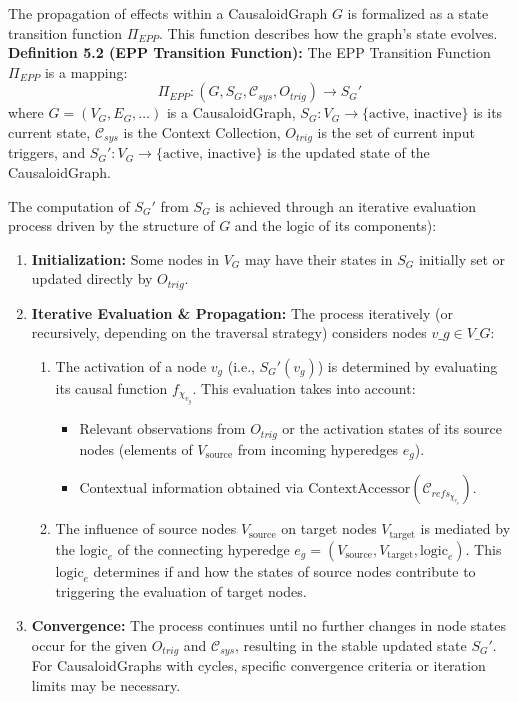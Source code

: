 \begin{definition}
\label{def:epp_transition}     
    The propagation of effects within a CausaloidGraph \(G\) is formalized as a state transition function \(\Pi_{EPP}\). This function describes how the graph's state evolves.
    \textbf{Definition 5.2 (EPP Transition Function):} The EPP Transition Function \(\Pi_{EPP}\) is a mapping:
    \[ \Pi_{EPP} : (G, S_G, \mathcal{C}_{sys}, O_{trig}) \to S_G' \]
    where \(G=(V_G, E_G, \dots)\) is a CausaloidGraph, \(S_G: V_G \to \{\text{active, inactive}\}\) is its current state, \(\mathcal{C}_{sys}\) is the Context Collection, \(O_{trig}\) is the set of current input triggers, and \(S_G': V_G \to \{\text{active, inactive}\}\) is the updated state of the CausaloidGraph.

    The computation of \(S_G'\) from \(S_G\) is achieved through an iterative evaluation process driven by the structure of \(G\) and the logic of its components):
    \begin{enumerate}
        \item \textbf{Initialization:} Some nodes in \(V_G\) may have their states in \(S_G\) initially set or updated directly by \(O_{trig}\).
        \item \textbf{Iterative Evaluation \& Propagation:} The process iteratively (or recursively, depending on the traversal strategy) considers nodes \(v\_g \in V\_G\):
            \begin{enumerate}
                \item The activation of a node \(v_g\) (i.e., \(S_G'(v_g)\)) is determined by evaluating its causal function \(f_{\chi_{v_g}}\). This evaluation takes into account:
                    \begin{itemize}
                        \item Relevant observations from \(O_{trig}\) or the activation states of its source nodes (elements of \(V_{\text{source}}\) from incoming hyperedges \(e_g\)).
                        \item Contextual information obtained via \(\text{ContextAccessor}(\mathcal{C}_{refs_{\chi_{v_g}}})\).
                    \end{itemize}
                \item The influence of source nodes \(V_{\text{source}}\) on target nodes \(V_{\text{target}}\) is mediated by the \(\text{logic}_e\) of the connecting hyperedge \(e_g = (V_{\text{source}}, V_{\text{target}}, \text{logic}_e)\). This \(\text{logic}_e\) determines if and how the states of source nodes contribute to triggering the evaluation of target nodes.
            \end{enumerate}
        \item \textbf{Convergence:} The process continues until no further changes in node states occur for the given \(O_{trig}\) and \(\mathcal{C}_{sys}\), resulting in the stable updated state \(S_G'\). For CausaloidGraphs with cycles, specific convergence criteria or iteration limits may be necessary.
    \end{enumerate}
 \end{definition}   
    
